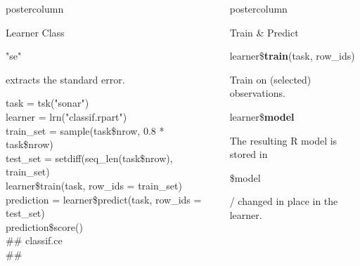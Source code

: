 \documentclass{beamer}
\newlength{\columnheight} %
\newcommand{\codeinline}[1]{\begin{codeboxinline}#1\end{codeboxinline}}
\begin{document}
\begin{frame}[fragile]{}
\begin{columns}
\begin{column}{.245\textwidth}
\begin{beamercolorbox}[center]{postercolumn}
\begin{minipage}{.98\textwidth}
{\begin{myblock}{Learner Class}
	                        \codeinline{"se"} extracts the standard error.
							\vspace{1em}
							\begin{codeboxexample}
								{\scriptsize
									task = tsk("sonar")\\
									learner = lrn("classif.rpart")
									\vspace{1em}
									\\
									train\_set = sample(task\$nrow, 0.8 * task\$nrow)\\
									test\_set = setdiff(seq\_len(task\$nrow), train\_set)
									\vspace{1em}
									\\
									learner\$train(task, row\_ids = train\_set)
									\vspace{1em}
									\\
									prediction = learner\$predict(task, row\_ids = test\_set)\\
									prediction\$score()\\
									\#\# classif.ce\\
									\#\# }
							\end{codeboxexample}
						\end{myblock}
					\vfill}
				\end{minipage}
			\end{beamercolorbox}
		\end{column}
		\begin{column}{.245\textwidth}
			\begin{beamercolorbox}[center]{postercolumn}
				\begin{minipage}{.98\textwidth}
					\parbox[t][\columnheight]{\textwidth}{
						\begin{myblock}{Train \& Predict}
							\vspace{0.25em}
							\begin{codebox}
								learner\$\textbf{train}(task, row\_ids)
							\end{codebox}
	                        Train on (selected) observations. 
	   						\\
							\begin{codebox}
								learner\$\textbf{model}
							\end{codebox}
							The resulting R model is stored in \codeinline{\$model}/ changed in place in the learner.
							\\
							\vspace{1em} %
							\begin{codebox}

\end{codebox}
\end{myblock}}
\end{minipage}
\end{beamercolorbox}
\end{column}
\end{columns}
\end{frame}
\end{document}
